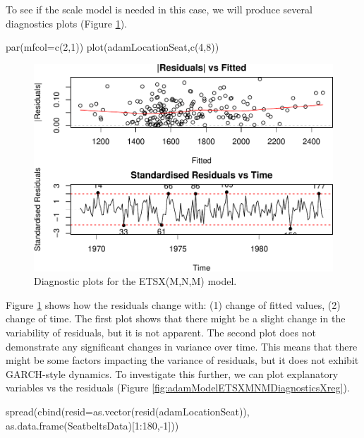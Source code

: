 \documentclass[
]{book}
\newenvironment{Shaded}{\begin{snugshade}}{\end{snugshade}}
\newcommand{\AttributeTok}[1]{\textcolor[rgb]{0.77,0.63,0.00}{#1}}
\newcommand{\DecValTok}[1]{\textcolor[rgb]{0.00,0.00,0.81}{#1}}
\newcommand{\FunctionTok}[1]{\textcolor[rgb]{0.00,0.00,0.00}{#1}}
\newcommand{\NormalTok}[1]{#1}
\newcommand{\SpecialCharTok}[1]{\textcolor[rgb]{0.00,0.00,0.00}{#1}}
\theoremstyle{definition}
\theoremstyle{definition}
\theoremstyle{definition}
\theoremstyle{definition}
\theoremstyle{remark}
\begin{document}
To see if the scale model is needed in this case, we will produce several diagnostics plots (Figure \ref{fig:adamModelETSXMNMDiagnostics48}).

\begin{Shaded}
\begin{Highlighting}[]
\FunctionTok{par}\NormalTok{(}\AttributeTok{mfcol=}\FunctionTok{c}\NormalTok{(}\DecValTok{2}\NormalTok{,}\DecValTok{1}\NormalTok{))}
\FunctionTok{plot}\NormalTok{(adamLocationSeat,}\FunctionTok{c}\NormalTok{(}\DecValTok{4}\NormalTok{,}\DecValTok{8}\NormalTok{))}
\end{Highlighting}
\end{Shaded}

\begin{figure}
\centering
\includegraphics{Svetunkov--2022----ADAM_files/figure-latex/adamModelETSXMNMDiagnostics48-1.pdf}
\caption{\label{fig:adamModelETSXMNMDiagnostics48}Diagnostic plots for the ETSX(M,N,M) model.}
\end{figure}

Figure \ref{fig:adamModelETSXMNMDiagnostics48} shows how the residuals change with: (1) change of fitted values, (2) change of time. The first plot shows that there might be a slight change in the variability of residuals, but it is not apparent. The second plot does not demonstrate any significant changes in variance over time. This means that there might be some factors impacting the variance of residuals, but it does not exhibit GARCH-style dynamics. To investigate this further, we can plot explanatory variables vs the residuals (Figure \ref{fig:adamModelETSXMNMDiagnosticsXreg}).

\begin{Shaded}
\begin{Highlighting}[]
\FunctionTok{spread}\NormalTok{(}\FunctionTok{cbind}\NormalTok{(}\AttributeTok{resid=}\FunctionTok{as.vector}\NormalTok{(}\FunctionTok{resid}\NormalTok{(adamLocationSeat)),}
             \FunctionTok{as.data.frame}\NormalTok{(SeatbeltsData)[}\DecValTok{1}\SpecialCharTok{:}\DecValTok{180}\NormalTok{,}\SpecialCharTok{{-}}\DecValTok{1}\NormalTok{]))}
\end{Highlighting}
\end{Shaded}
\end{document}
